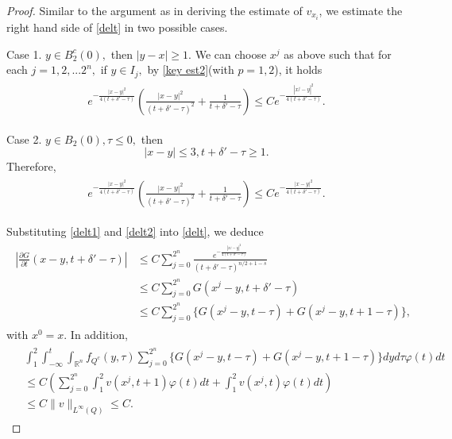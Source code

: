 \documentclass[12pt]{article}
\theoremstyle{remark}
\numberwithin{equation}{section}
\newcommand{\R}{\mathbb{R}}
\begin{document}
\begin{proof}
Similar to the argument as in deriving the estimate of $v_{x_i}$, we estimate the right hand side of  \eqref{delt} in two possible cases.

Case 1. $y\in B_2^c(0),$ then $|y-x|\geq 1.$ We can choose $x^j$ as above such that for each $j=1,2,...2^n,$ if $y\in I_j,$ by \eqref{key est2}(with $p=1,2$), it holds
\begin{eqnarray}\label{delt1}
\begin{aligned}e^{-\frac{|x-y|^2}{4(t+\delta'-\tau)}}\left(\frac{|x-y|^2}{(t+\delta'-\tau)^2}+\frac{1}{t+\delta'-\tau}\right)\leq Ce^{-\frac{|x^j-y|^2}{4(t+\delta'-\tau)}}.
\end{aligned}
\end{eqnarray}

Case 2. $y\in B_2(0), \tau\leq 0,$ then
\[|x-y|\leq 3, t+\delta'-\tau\geq1.\]
Therefore,
\begin{eqnarray}\label{delt2}
\begin{aligned}e^{-\frac{|x-y|^2}{4(t+\delta'-\tau)}}\left(\frac{|x-y|^2}{(t+\delta'-\tau)^2}+\frac{1}{t+\delta'-\tau}\right)\leq Ce^{-\frac{|x-y|^2}{4(t+\delta'-\tau)}}.
\end{aligned}
\end{eqnarray}

Substituting \eqref{delt1} and \eqref{delt2} into \eqref{delt}, we deduce
\begin{eqnarray}\label{delt3}
\begin{aligned}\left|\frac{\partial G}{\partial t}(x-y,t+\delta'-\tau)\right|&\leq C\sum\limits_{j=0}^{2^n}\frac{e^{-\frac{|x^j-y|^2}{4(t+\delta'-\tau)}}}{{(t+\delta'-\tau)}^{n/2+1-s}}\\
&\leq  C\sum\limits_{j=0}^{2^n} G(x^j-y,t+\delta'-\tau)\\
&\leq  C\sum\limits_{j=0}^{2^n}\{ G(x^j-y,t-\tau)+ G(x^j-y,t+1-\tau)\},\end{aligned}
\end{eqnarray}
{with} $x^0=x$.
In addition,
\begin{eqnarray}\label{delt4}
\begin{aligned}&\int_1^2\int_{-\infty}^{t}\int_{\R^n}f_{Q^c}(y,\tau)\sum\limits_{j=0}^{2^n}\{ G(x^j-y,t-\tau)+ G(x^j-y,t+1-\tau)\}dyd\tau\varphi(t)dt\\
&\leq C\left(\sum\limits_{j=0}^{2^n}\int_1^2{v(x^j,t+1)\varphi(t)dt+\int_1^2v(x^j,t)}\varphi(t)dt\right)\\
&\leq C \|v\|_{L^{\infty}(Q)}\leq C.\end{aligned}
\end{eqnarray}


\end{proof}
\end{document}
